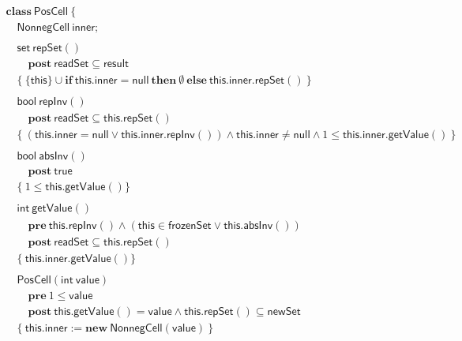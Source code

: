 \documentclass{article}
\begin{document}
$$\begin{array}{l}
\mathbf{class}\ \mathsf{PosCell}\ \{\\
\quad \mathsf{NonnegCell}\ \mathsf{inner};\\
\\
\quad \mathsf{set}\ \mathsf{repSet}()\\
\quad\quad \mathbf{post}\ \mathsf{readSet} \subseteq \mathsf{result}\\
\quad \{\ \{\mathsf{this}\} \cup \mathbf{if}\ \mathsf{this}.\mathsf{inner} = \mathsf{null}\ \mathbf{then}\ \emptyset\ \mathbf{else}\ \mathsf{this}.\mathsf{inner}.\mathsf{repSet}()\ \}\\
\\
\quad \mathsf{bool}\ \mathsf{repInv}()\\
\quad\quad \mathbf{post}\ \mathsf{readSet} \subseteq \mathsf{this}.\mathsf{repSet}()\\
\quad \{\ (\mathsf{this}.\mathsf{inner} = \mathsf{null} \lor \mathsf{this}.\mathsf{inner}.\mathsf{repInv}()) \land \mathsf{this}.\mathsf{inner} \neq \mathsf{null} \land 1 \le \mathsf{this}.\mathsf{inner}.\mathsf{getValue}()\ \}\\
\\
\quad \mathsf{bool}\ \mathsf{absInv}()\\
\quad\quad \mathbf{post}\ \mathsf{true}\\
\quad \{\ 1 \le \mathsf{this}.\mathsf{getValue}() \}\\
\\
\quad \mathsf{int}\ \mathsf{getValue}()\\
\quad\quad \mathbf{pre}\ \mathsf{this}.\mathsf{repInv}() \land (\mathsf{this} \in \mathsf{frozenSet} \lor \mathsf{this}.\mathsf{absInv}())\\
\quad\quad \mathbf{post}\ \mathsf{readSet} \subseteq \mathsf{this}.\mathsf{repSet}()\\
\quad \{\ \mathsf{this}.\mathsf{inner}.\mathsf{getValue}() \}\\
\\
\quad \mathsf{PosCell}(\mathsf{int}\ \mathsf{value})\\
\quad\quad \mathbf{pre}\ 1 \le \mathsf{value}\\
\quad\quad \mathbf{post}\ \mathsf{this}.\mathsf{getValue}() = \mathsf{value} \land \mathsf{this}.\mathsf{repSet}() \subseteq \mathsf{newSet}\\
\quad \{\ \mathsf{this}.\mathsf{inner} := \mathbf{new}\ \mathsf{NonnegCell}(\mathsf{value})\ \}\\
\\

\end{array}$$
\end{document}
